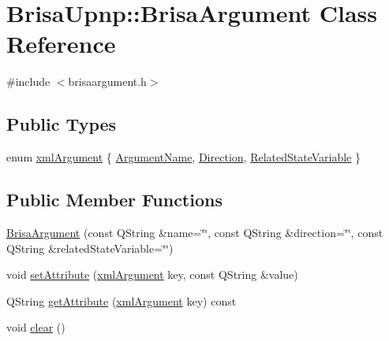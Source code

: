 \hypertarget{classBrisaUpnp_1_1BrisaArgument}{
\section{BrisaUpnp::BrisaArgument Class Reference}
\label{classBrisaUpnp_1_1BrisaArgument}
}


{\ttfamily \#include $<$brisaargument.h$>$}\subsection*{Public Types}
\begin{DoxyCompactItemize}
\item 
enum \hyperlink{classBrisaUpnp_1_1BrisaArgument_a4e73081817b045be334d6def161c9f9d}{xmlArgument} \{ \hyperlink{classBrisaUpnp_1_1BrisaArgument_a4e73081817b045be334d6def161c9f9da667780d903e96743759d71d238ca385e}{ArgumentName}, 
\hyperlink{classBrisaUpnp_1_1BrisaArgument_a4e73081817b045be334d6def161c9f9dac26bf7b2d6af6e9f703b711300be4b0a}{Direction}, 
\hyperlink{classBrisaUpnp_1_1BrisaArgument_a4e73081817b045be334d6def161c9f9da3247f994ef00b6adb3db82267b82e7c5}{RelatedStateVariable}
 \}
\end{DoxyCompactItemize}
\subsection*{Public Member Functions}
\begin{DoxyCompactItemize}
\item 
\hyperlink{classBrisaUpnp_1_1BrisaArgument_aeee47b38f9dd191543a00c7c52622b43}{BrisaArgument} (const QString \&name=\char`\"{}\char`\"{}, const QString \&direction=\char`\"{}\char`\"{}, const QString \&relatedStateVariable=\char`\"{}\char`\"{})
\item 
void \hyperlink{classBrisaUpnp_1_1BrisaArgument_af24c372283313226cedd5a516f1162b0}{setAttribute} (\hyperlink{classBrisaUpnp_1_1BrisaArgument_a4e73081817b045be334d6def161c9f9d}{xmlArgument} key, const QString \&value)
\item 
QString \hyperlink{classBrisaUpnp_1_1BrisaArgument_a5090d2b5a50c207478094ab34bf2b7b4}{getAttribute} (\hyperlink{classBrisaUpnp_1_1BrisaArgument_a4e73081817b045be334d6def161c9f9d}{xmlArgument} key) const 
\item 
void \hyperlink{classBrisaUpnp_1_1BrisaArgument_aa8f2c578c82ee25bf319c417ffe12c9a}{clear} ()
\end{DoxyCompactItemize}


